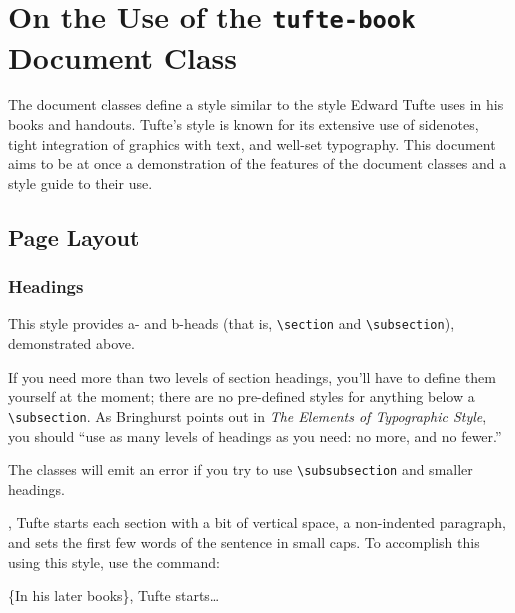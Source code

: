 

\chapter[On the Use of the tufte-book Document Class]{On the Use of the \texttt{tufte-book} Document Class}
\label{ch:tufte-book}

The \TL document classes define a style similar to the
style Edward Tufte uses in his books and handouts.  Tufte's style is known
for its extensive use of sidenotes, tight integration of graphics with
text, and well-set typography.  This document aims to be at once a
demonstration of the features of the \TL document classes
and a style guide to their use.

\section{Page Layout}\label{sec:page-layout}
\subsection{Headings}\label{sec:headings}
This style provides a- and b-heads (that is,
\Verb|\section| and \Verb|\subsection|), demonstrated above.

If you need more than two levels of section headings, you'll have to define
them yourself at the moment; there are no pre-defined styles for anything below
a \Verb|\subsection|.  As Bringhurst points out in \textit{The Elements of
Typographic Style},\cite{Bringhurst2005} you should ``use as many levels of
headings as you need: no more, and no fewer.''

The \TL classes will emit an error if you try to use
\linebreak\Verb|\subsubsection| and smaller headings.

,\cite{Tufte2006} Tufte
starts each section with a bit of vertical space, a non-indented paragraph,
and sets the first few words of the sentence in small caps.  To
accomplish this using this style, use the  command:
\begin{docspec}
  \{In his later books\}, Tufte starts\ldots
\end{docspec}


